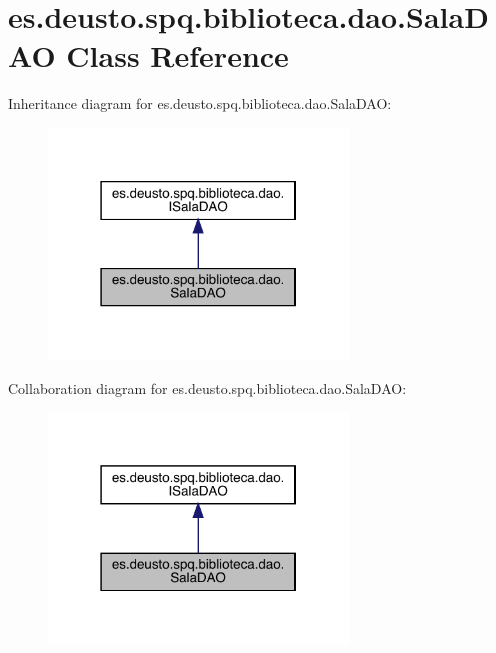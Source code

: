 \hypertarget{classes_1_1deusto_1_1spq_1_1biblioteca_1_1dao_1_1_sala_d_a_o}{}\section{es.\+deusto.\+spq.\+biblioteca.\+dao.\+Sala\+D\+AO Class Reference}
\label{classes_1_1deusto_1_1spq_1_1biblioteca_1_1dao_1_1_sala_d_a_o}


Inheritance diagram for es.\+deusto.\+spq.\+biblioteca.\+dao.\+Sala\+D\+AO\+:
\nopagebreak
\begin{figure}[H]
\begin{center}
\leavevmode
\includegraphics[width=226pt]{classes_1_1deusto_1_1spq_1_1biblioteca_1_1dao_1_1_sala_d_a_o__inherit__graph}
\end{center}
\end{figure}


Collaboration diagram for es.\+deusto.\+spq.\+biblioteca.\+dao.\+Sala\+D\+AO\+:
\nopagebreak
\begin{figure}[H]
\begin{center}
\leavevmode
\includegraphics[width=226pt]{classes_1_1deusto_1_1spq_1_1biblioteca_1_1dao_1_1_sala_d_a_o__coll__graph}
\end{center}
\end{figure}
